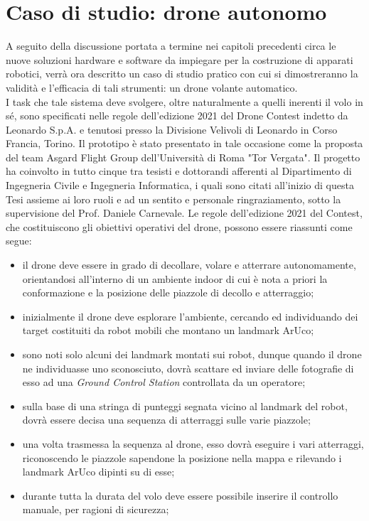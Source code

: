 
\chapter[Caso di studio: drone autonomo]{Caso di studio: drone autonomo}
\label{chap:Chapter3}
\doublespacing
\fontsize{12}{12}\selectfont
\indent A seguito della discussione portata a termine nei capitoli precedenti circa le nuove soluzioni hardware e software da impiegare per la costruzione di apparati robotici, verrà ora descritto un caso di studio pratico con cui si dimostreranno la validità e l'efficacia di tali strumenti: un drone volante automatico.\\
I task che tale sistema deve svolgere, oltre naturalmente a quelli inerenti il volo in sé, sono specificati nelle regole dell'edizione 2021 del Drone Contest indetto da Leonardo S.p.A. e tenutosi presso la Divisione Velivoli di Leonardo in Corso Francia, Torino. Il prototipo è stato presentato in tale occasione come la proposta del team Asgard Flight Group dell'Università di Roma "Tor Vergata". Il progetto ha coinvolto in tutto cinque tra tesisti e dottorandi afferenti al Dipartimento di Ingegneria Civile e Ingegneria Informatica, i quali sono citati all'inizio di questa Tesi assieme ai loro ruoli e ad un sentito e personale ringraziamento, sotto la supervisione del Prof. Daniele Carnevale. Le regole dell'edizione 2021 del Contest, che costituiscono gli obiettivi operativi del drone, possono essere riassunti come segue:
\begin{itemize}
    \item il drone deve essere in grado di decollare, volare e atterrare autonomamente, orientandosi all'interno di un ambiente indoor di cui è nota a priori la conformazione e la posizione delle piazzole di decollo e atterraggio;
    \item inizialmente il drone deve esplorare l'ambiente, cercando ed individuando dei target costituiti da robot mobili che montano un landmark ArUco;
    \item sono noti solo alcuni dei landmark montati sui robot, dunque quando il drone ne individuasse uno sconosciuto, dovrà scattare ed inviare delle fotografie di esso ad una \emph{Ground Control Station} controllata da un operatore;
    \item sulla base di una stringa di punteggi segnata vicino al landmark del robot, dovrà essere decisa una sequenza di atterraggi sulle varie piazzole;
    \item una volta trasmessa la sequenza al drone, esso dovrà eseguire i vari atterraggi, riconoscendo le piazzole sapendone la posizione nella mappa e rilevando i landmark ArUco dipinti su di esse;
    \item durante tutta la durata del volo deve essere possibile inserire il controllo manuale, per ragioni di sicurezza;
\end{itemize}
